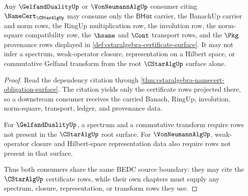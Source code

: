 \begin{theorem}
\label{thm:cstaralgebra-gelfand-vonneumann-consumer-boundary}
Any $\GelfandDualityUp$ or $\VonNeumannAlgUp$ consumer citing $\NameCert_{\CStarAlgUp}$ may consume only the $\mathsf{BHist}$ carrier, the BanachUp carrier and norm rows, the RingUp multiplication row, the involution row, the norm-square compatibility row, the $\hsame$ and $\Cont$ transport rows, and the $\Pkg$ provenance rows displayed in \autoref{def:cstaralgebra-certificate-surface}. It may not infer a spectrum, weak-operator closure, representation on a Hilbert space, or commutative Gelfand transform from the root $\CStarAlgUp$ surface alone.
\end{theorem}
\begin{proof}
Read the dependency citation through \autoref{thm:cstaralgebra-namecert-obligation-surface}. The citation yields only the certificate rows projected there, so a downstream consumer receives the carried Banach, RingUp, involution, norm-square, transport, ledger, and provenance data.

For $\GelfandDualityUp$, a spectrum and a commutative transform require rows not present in the $\CStarAlgUp$ root surface. For $\VonNeumannAlgUp$, weak-operator closure and Hilbert-space representation data also require rows not present in that surface.

Thus both consumers share the same BEDC source boundary: they may cite the $\CStarAlgUp$ certificate rows, while their own chapters must supply any spectrum, closure, representation, or transform rows they use.
\end{proof}

